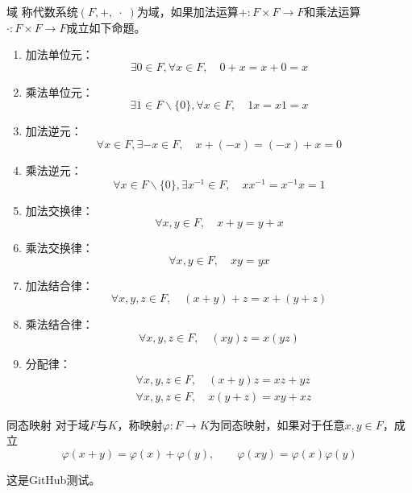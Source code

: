 \documentclass[lang = cn, scheme = chinese, thmcnt = section, usesamecnt]{elegantbook}
\begin{document}
\begin{definition}{域}
	称代数系统$(F,+,\;\cdot\;)$为域，如果加法运算$+:F\times F\to F$和乘法运算$\cdot :F\times F\to F$成立如下命题。
	\begin{enumerate}
		\item 加法单位元：
		$$
		\exists 0\in F,\forall x\in F,\quad 0+x=x+0=x
		$$
		\item 乘法单位元：
		$$
		\exists 1\in F\backslash\{0\},\forall x\in F,\quad 1x=x1=x
		$$
		\item 加法逆元：
		$$
		\forall x\in F,\exists-x\in F,\quad x+(-x)=(-x)+x=0
		$$
		\item 乘法逆元：
		$$
		\forall x\in F\backslash\{0\},\exists x^{-1}\in F,\quad xx^{-1}=x^{-1}x=1
		$$
		\item 加法交换律：
		$$
		\forall x,y\in F,\quad x+y=y+x
		$$
		\item 乘法交换律：
		$$
		\forall x,y\in F,\quad xy=yx
		$$
		\item 加法结合律：
		$$
		\forall x,y,z\in F,\quad (x+y)+z=x+(y+z)
		$$
		\item 乘法结合律：
		$$
		\forall x,y,z\in F,\quad (xy)z=x(yz)
		$$
		\item 分配律：
		\begin{align*}
			&\forall x,y,z\in F,\quad (x+y)z=xz+yz\\
			&\forall x,y,z\in F,\quad x(y+z)=xy+xz
		\end{align*}
	\end{enumerate}
\end{definition}

\begin{definition}{同态映射}
	对于域$F$与$K$，称映射$\varphi:F\to K$为同态映射，如果对于任意$x,y\in F$，成立%
	$$
	\varphi(x+y)=\varphi(x)+\varphi(y),\qquad
	\varphi(xy)=\varphi(x)\varphi(y)
	$$
\end{definition}

这是GitHub测试。
\end{document}
